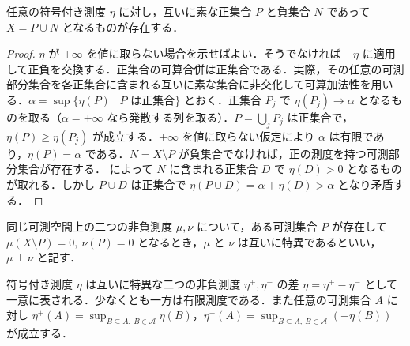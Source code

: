\begin{prop}[Hahn分解]
任意の符号付き測度 $\eta$ に対し，互いに素な正集合 $P$ と負集合 $N$ であって $X=P\cup N$ となるものが存在する．
\end{prop}
\begin{proof}
$\eta$ が $+\infty$ を値に取らない場合を示せばよい．そうでなければ $-\eta$ に適用して正負を交換する．正集合の可算合併は正集合である．実際，その任意の可測部分集合を各正集合に含まれる互いに素な集合に非交化して可算加法性を用いる．$\alpha=\sup\{\eta(P)\mid P\text{ は正集合}\}$ とおく．正集合 $P_j$ で $\eta(P_j)\to\alpha$ となるものを取る（$\alpha=+\infty$ なら発散する列を取る）．$P=\bigcup_j P_j$ は正集合で，$\eta(P)\geq\eta(P_j)$ が成立する．$+\infty$ を値に取らない仮定により $\alpha$ は有限であり，$\eta(P)=\alpha$ である．$N=X\setminus P$ が負集合でなければ，正の測度を持つ可測部分集合が存在する． によって $N$ に含まれる正集合 $D$ で $\eta(D)>0$ となるものが取れる．しかし $P\cup D$ は正集合で $\eta(P\cup D)=\alpha+\eta(D)>\alpha$ となり矛盾する．
\end{proof}
\begin{defn}[互いに特異な測度]
同じ可測空間上の二つの非負測度 $\mu,\nu$ について，ある可測集合 $P$ が存在して $\mu(X\setminus P)=0,\ \nu(P)=0$ となるとき，$\mu$ と $\nu$ は互いに特異であるといい，$\mu\perp\nu$ と記す．
\end{defn}
\begin{prop}[Jordan分解]
符号付き測度 $\eta$ は互いに特異な二つの非負測度 $\eta^+,\eta^-$ の差 $\eta=\eta^+-\eta^-$ として一意に表される．少なくとも一方は有限測度である．また任意の可測集合 $A$ に対し $\eta^+(A)=\sup_{B\subseteq A,\ B\in\mathcal A}\eta(B)$，$\eta^-(A)=\sup_{B\subseteq A,\ B\in\mathcal A}(-\eta(B))$ が成立する．
\end{prop}
